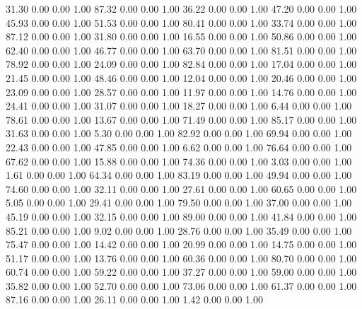    31.30   0.00   0.00   1.00
   87.32   0.00   0.00   1.00
   36.22   0.00   0.00   1.00
   47.20   0.00   0.00   1.00
   45.93   0.00   0.00   1.00
   51.53   0.00   0.00   1.00
   80.41   0.00   0.00   1.00
   33.74   0.00   0.00   1.00
   87.12   0.00   0.00   1.00
   31.80   0.00   0.00   1.00
   16.55   0.00   0.00   1.00
   50.86   0.00   0.00   1.00
   62.40   0.00   0.00   1.00
   46.77   0.00   0.00   1.00
   63.70   0.00   0.00   1.00
   81.51   0.00   0.00   1.00
   78.92   0.00   0.00   1.00
   24.09   0.00   0.00   1.00
   82.84   0.00   0.00   1.00
   17.04   0.00   0.00   1.00
   21.45   0.00   0.00   1.00
   48.46   0.00   0.00   1.00
   12.04   0.00   0.00   1.00
   20.46   0.00   0.00   1.00
   23.09   0.00   0.00   1.00
   28.57   0.00   0.00   1.00
   11.97   0.00   0.00   1.00
   14.76   0.00   0.00   1.00
   24.41   0.00   0.00   1.00
   31.07   0.00   0.00   1.00
   18.27   0.00   0.00   1.00
    6.44   0.00   0.00   1.00
   78.61   0.00   0.00   1.00
   13.67   0.00   0.00   1.00
   71.49   0.00   0.00   1.00
   85.17   0.00   0.00   1.00
   31.63   0.00   0.00   1.00
    5.30   0.00   0.00   1.00
   82.92   0.00   0.00   1.00
   69.94   0.00   0.00   1.00
   22.43   0.00   0.00   1.00
   47.85   0.00   0.00   1.00
    6.62   0.00   0.00   1.00
   76.64   0.00   0.00   1.00
   67.62   0.00   0.00   1.00
   15.88   0.00   0.00   1.00
   74.36   0.00   0.00   1.00
    3.03   0.00   0.00   1.00
    1.61   0.00   0.00   1.00
   64.34   0.00   0.00   1.00
   83.19   0.00   0.00   1.00
   49.94   0.00   0.00   1.00
   74.60   0.00   0.00   1.00
   32.11   0.00   0.00   1.00
   27.61   0.00   0.00   1.00
   60.65   0.00   0.00   1.00
    5.05   0.00   0.00   1.00
   29.41   0.00   0.00   1.00
   79.50   0.00   0.00   1.00
   37.00   0.00   0.00   1.00
   45.19   0.00   0.00   1.00
   32.15   0.00   0.00   1.00
   89.00   0.00   0.00   1.00
   41.84   0.00   0.00   1.00
   85.21   0.00   0.00   1.00
    9.02   0.00   0.00   1.00
   28.76   0.00   0.00   1.00
   35.49   0.00   0.00   1.00
   75.47   0.00   0.00   1.00
   14.42   0.00   0.00   1.00
   20.99   0.00   0.00   1.00
   14.75   0.00   0.00   1.00
   51.17   0.00   0.00   1.00
   13.76   0.00   0.00   1.00
   60.36   0.00   0.00   1.00
   80.70   0.00   0.00   1.00
   60.74   0.00   0.00   1.00
   59.22   0.00   0.00   1.00
   37.27   0.00   0.00   1.00
   59.00   0.00   0.00   1.00
   35.82   0.00   0.00   1.00
   52.70   0.00   0.00   1.00
   73.06   0.00   0.00   1.00
   61.37   0.00   0.00   1.00
   87.16   0.00   0.00   1.00
   26.11   0.00   0.00   1.00
    1.42   0.00   0.00   1.00
